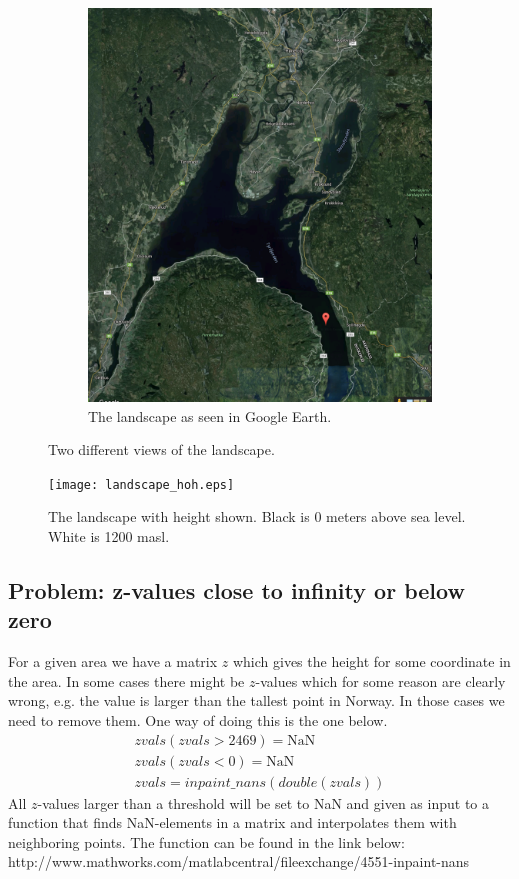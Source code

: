 \documentclass[10pt,a4paper]{article}
\begin{document}
\begin{figure}[h!]
\begin{subfigure}[h]{0.65\textwidth}
        \includegraphics[height=1\textwidth]{earth_map.png}
        \caption{The landscape as seen in Google Earth.}
    \end{subfigure}
    \caption{Two different views of the landscape.}
\end{figure}




\begin{figure}[H]
  \centering
    \texttt{[image: landscape\_hoh.eps]}
  \caption{The landscape with height shown. Black is 0 meters above sea level. White is 1200 masl.}
\end{figure}

\subsection{Problem: z-values close to infinity or below zero}
For a given area we have a matrix $z$ which gives the height for some coordinate in the area. In some cases there might be $z$-values which for some reason are clearly wrong, e.g. the value is larger than the tallest point in Norway. In those cases we need to remove them. One way of doing this is the one below.
\begin{align}
zvals(zvals > 2469) = \textrm{NaN}\\
zvals(zvals < 0) = \textrm{NaN}\\
zvals = inpaint\_nans(double(zvals))
\end{align}
All $z$-values larger than a threshold will be set to NaN and given as input to a function that finds NaN-elements in a matrix and interpolates them with neighboring points. The function can be found in the link below:\\
 http://www.mathworks.com/matlabcentral/fileexchange/4551-inpaint-nans
\end{document}
